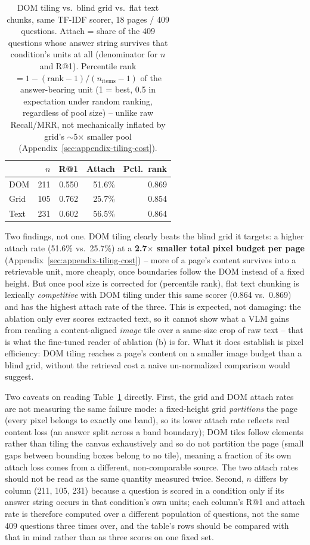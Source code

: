 \begin{table}[t]
\centering
\small
\begin{tabular}{@{}lrrrr@{}}
\toprule
 & $n$ & R@1 & Attach & Pctl.\ rank \\
\midrule
DOM  & 211 & 0.550 & 51.6\% & 0.869 \\
Grid & 105 & 0.762 & 25.7\% & 0.854 \\
Text & 231 & 0.602 & 56.5\% & 0.864 \\
\bottomrule
\end{tabular}
\caption{DOM tiling vs.\ blind grid vs.\ flat text chunks, same TF-IDF scorer, 18 pages / 409 questions. Attach = share of the 409 questions whose answer string survives that condition's units at all (denominator for $n$ and R@1). Percentile rank $= 1 - (\text{rank}-1)/(n_\text{items}-1)$ of the answer-bearing unit (1 = best, 0.5 in expectation under random ranking, regardless of pool size) -- unlike raw Recall/MRR, not mechanically inflated by grid's $\sim$5$\times$ smaller pool (Appendix~\ref{sec:appendix-tiling-cost}).}
\label{tab:tiling-ablation}
\end{table}

Two findings, not one. DOM tiling clearly beats the blind grid it targets: a higher attach rate (51.6\% vs.\ 25.7\%) at a \textbf{2.7$\times$ smaller total pixel budget per page} (Appendix~\ref{sec:appendix-tiling-cost}) -- more of a page's content survives into a retrievable unit, more cheaply, once boundaries follow the DOM instead of a fixed height. But once pool size is corrected for (percentile rank), flat text chunking is lexically \emph{competitive} with DOM tiling under this same scorer (0.864 vs.\ 0.869) and has the highest attach rate of the three. This is expected, not damaging: the ablation only ever scores extracted text, so it cannot show what a VLM gains from reading a content-aligned \emph{image} tile over a same-size crop of raw text -- that is what the fine-tuned reader of ablation (b) is for. What it does establish is pixel efficiency: DOM tiling reaches a page's content on a smaller image budget than a blind grid, without the retrieval cost a naive un-normalized comparison would suggest.

Two caveats on reading Table~\ref{tab:tiling-ablation} directly. First, the grid and DOM attach rates are not measuring the same failure mode: a fixed-height grid \emph{partitions} the page (every pixel belongs to exactly one band), so its lower attach rate reflects real content loss (an answer split across a band boundary); DOM tiles follow elements rather than tiling the canvas exhaustively and so do not partition the page (small gaps between bounding boxes belong to no tile), meaning a fraction of its own attach loss comes from a different, non-comparable source. The two attach rates should not be read as the same quantity measured twice. Second, $n$ differs by column (211, 105, 231) because a question is scored in a condition only if its answer string occurs in that condition's own units; each column's R@1 and attach rate is therefore computed over a different population of questions, not the same 409 questions three times over, and the table's rows should be compared with that in mind rather than as three scores on one fixed set.

